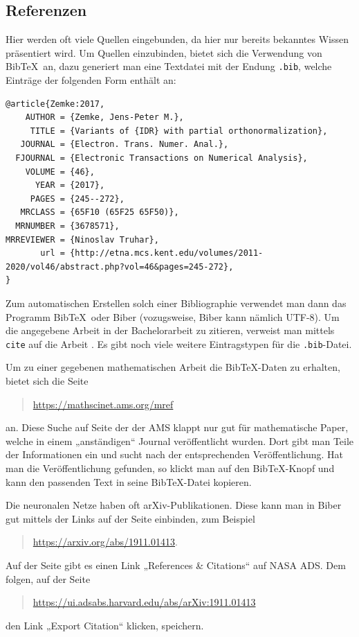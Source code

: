 \documentclass[12pt]{article}
\theoremstyle{definition}
\numberwithin{equation}{section}
\begin{document}
\subsection{Referenzen}
\label{sec:Referenzen}

Hier werden oft viele Quellen eingebunden, da hier nur bereits
bekanntes Wissen präsentiert wird. Um Quellen einzubinden, bietet sich
die Verwendung von Bib\TeX\ an, dazu generiert man eine Textdatei mit
der Endung \texttt{.bib}, welche Einträge der folgenden Form enthält
an:
\begin{verbatim}
@article{Zemke:2017,
    AUTHOR = {Zemke, Jens-Peter M.},
     TITLE = {Variants of {IDR} with partial orthonormalization},
   JOURNAL = {Electron. Trans. Numer. Anal.},
  FJOURNAL = {Electronic Transactions on Numerical Analysis},
    VOLUME = {46},
      YEAR = {2017},
     PAGES = {245--272},
   MRCLASS = {65F10 (65F25 65F50)},
  MRNUMBER = {3678571},
MRREVIEWER = {Ninoslav Truhar},
       url = {http://etna.mcs.kent.edu/volumes/2011-2020/vol46/abstract.php?vol=46&pages=245-272},
}
\end{verbatim}

Zum automatischen Erstellen solch einer Bibliographie verwendet man
dann das Programm Bib\TeX\ oder Biber (vozugsweise, Biber kann nämlich
UTF-8). Um die angegebene Arbeit in der Bachelorarbeit zu zitieren,
verweist man mittels \texttt{cite} auf die Arbeit \cite{Zemke:2017}.
Es gibt noch viele weitere Eintragstypen für die
\texttt{.bib}-Datei.

Um zu einer gegebenen mathematischen Arbeit die Bib\TeX-Daten zu
erhalten, bietet sich die Seite
\begin{quote}
  \url{https://mathscinet.ams.org/mref}
\end{quote}
an. Diese Suche auf Seite der der AMS klappt nur gut für mathematische
Paper, welche in einem „anständigen“ Journal veröffentlicht
wurden. Dort gibt man Teile der Informationen ein und sucht nach der
entsprechenden Veröffentlichung. Hat man die Veröffentlichung
gefunden, so klickt man auf den Bib\TeX-Knopf und kann den passenden
Text in seine Bib\TeX-Datei kopieren.

Die neuronalen Netze haben oft arXiv-Publikationen. Diese kann man
in Biber gut mittels der Links auf der Seite einbinden, zum Beispiel
\begin{quote}
  \url{https://arxiv.org/abs/1911.01413}.
\end{quote}
Auf der Seite gibt es einen Link „References \& Citations“ auf NASA
ADS. Dem folgen, auf der Seite
\begin{quote}
  \url{https://ui.adsabs.harvard.edu/abs/arXiv:1911.01413}
\end{quote}
den Link „Export Citation“ klicken, speichern.
\end{document}
